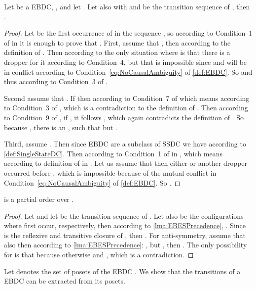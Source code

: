 \documentclass[runningheads,a4paper]{llncs}
\begin{document}
\begin{lemma}
\label{lma:EBESPrecedence}
Let  be a EBDC, , and let . Let also  with  and  be the
transition sequence of ,
then .
\end{lemma}

\begin{proof}
Let  be the first occurrence of  in the sequence , so according to
Condition~1 of  in \cite{dynamicCausality15} it is enough to prove that
.
First, assume that , then 
according to the definition of . Then
according to  the only situation where  is that
there is a dropper  for it according to
Condition~4, but that is impossible
since  and  will be in conflict according to
Condition~\ref{eq:NoCausalAmbiguity} of \ref{def:EBDC}. So  and thus  according to Condition~3 of .

Second assume that .
If  then according to
Condition~7 of   which
means  according to
Condition~3 of , which is a contradiction to the definition of . 
Then according to Condition~9 of , if , it follows , which again contradicts the definition of . So because , there is an , such that  but .

Third, assume . Then since EBDC are a subclass of SSDC we have
 according to \ref{def:SingleStateDC}. Then  according to
Condition~1 of  in \cite{dynamicCausality15}, which means  according to definition of  in .
Let us assume that  then either  or another dropper  occurred before , which is impossible because of the
mutual conflict in Condition~\ref{eq:NoCausalAmbiguity} of \ref{def:EBDC}. So .
\end{proof}

\begin{lemma}
	\label{lma:EBESPrecIsOrder}
	 is a partial order over . 
\end{lemma}

\begin{proof}
Let  and let  be the transition sequence of . Let also  be the configurations
where  first occur, respectively, then according to \lem\ref{lma:EBESPrecedence}, . Since  is the reflexive and transitive
closure of , then . For
anti-symmetry, assume that  also then according to
\lem\ref{lma:EBESPrecedence}: , but , then . The only
possibility for  is that  because otherwise  and ,
which is a contradiction.
\end{proof}

Let 
denotes the set of posets of the EBDC . We show that the
transitions of a EBDC  can be extracted from its posets.
\end{document}
